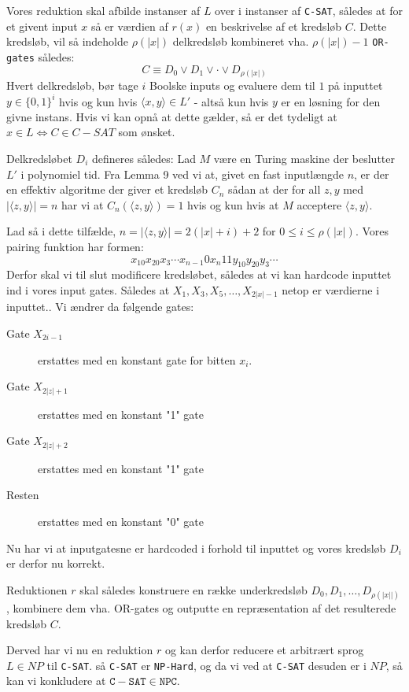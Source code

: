 \documentclass[danish,a4paper,article,12pt]{article}
\begin{document}
Vores reduktion skal afbilde instanser af $L$ over i instanser af \texttt{C-SAT}, således at for et givent input $x$ så er værdien af $r(x)$ en beskrivelse af et kredsløb $C$.
Dette kredsløb, vil så indeholde $\rho(|x|)$ delkredsløb kombineret vha. $\rho(|x|)-1$ \texttt{OR-gates} således:
\begin{equation}
C \equiv D_0 \vee D_1 \vee \cdot \vee D_{\rho(|x|)}
\end{equation}
Hvert delkredsløb, bør tage $i$ Boolske inputs og evaluere dem til $1$ på inputtet $y\in \{0,1\}^i$ hvis og kun hvis $\langle x,y \rangle \in L'$ - altså kun hvis $y$ er en løsning for den givne instans. Hvis vi kan opnå at dette gælder, så er det tydeligt at $x \in L \Leftrightarrow C \in C-SAT$ som ønsket.

Delkredsløbet $D_i$ defineres således:
Lad $M$ være en Turing maskine der beslutter $L'$ i polynomiel tid. Fra Lemma 9 ved vi at, givet en fast inputlængde $n$, er der en effektiv algoritme der giver et kredsløb $C_n$ sådan at der for all $z,y$ med $|\langle z,y \rangle|=n$ har vi at $C_n( \langle z,y \rangle ) = 1$ hvis og kun hvis at $M$ acceptere $\langle z,y \rangle$.

Lad så i dette tilfælde, $n=|\langle z,y \rangle| = 2(|x|+i)+2$ for $0 \leq i \leq \rho(|x|)$.
Vores pairing funktion har formen: 
\begin{equation}
x_10x_20x_3\cdots x_{n-1}0x_n11y_10y_20y_3\cdots
\end{equation}
Derfor skal vi til slut modificere kredsløbet, således at vi kan hardcode inputtet ind i vores input gates. Således at $X_1,X_3,X_5,\dots,X_{2|x|-1}$ netop er værdierne i inputtet.. Vi ændrer da følgende gates:
\begin{description}
\item[Gate $X_{2i-1}$] erstattes med en konstant gate for bitten $x_i$.
\item[Gate $X_{2|z|+1}$] erstattes med en konstant "1" gate
\item[Gate $X_{2|z|+2}$] erstattes med en konstant "1" gate
\item[Resten] erstattes med en konstant "0" gate
\end{description}

Nu har vi at inputgatesne er hardcoded i forhold til inputtet og vores kredsløb $D_i$ er derfor nu korrekt.

Reduktionen $r$ skal således konstruere en række underkredsløb $D_0,D_1,\dots,D_{\rho(|x||)}$, kombinere dem vha. OR-gates og outputte en repræsentation af det resulterede kredsløb $C$.

Derved har vi nu en reduktion $r$ og kan derfor reducere et arbitrært sprog $L\in NP$ til \texttt{C-SAT}. så \texttt{C-SAT} er \texttt{NP-Hard}, og da vi ved at \texttt{C-SAT} desuden er i $NP$, så kan vi konkludere at $\mathtt{C-SAT} \in \mathtt{NPC}$.
\end{document}
